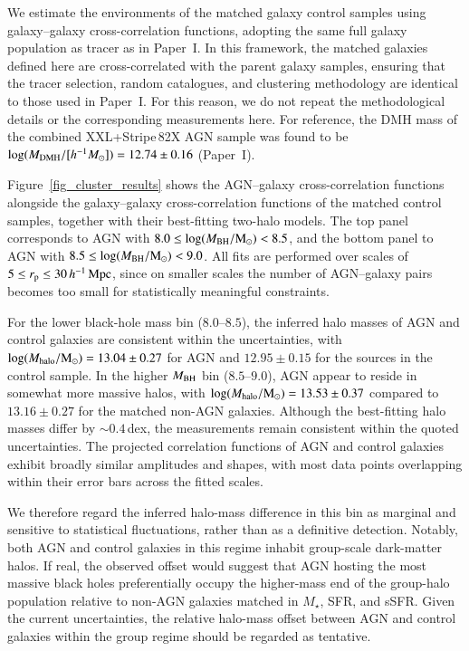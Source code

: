 \documentclass{aa}
\begin{document}
We estimate the environments of the matched galaxy control samples using galaxy--galaxy cross-correlation functions, adopting the same full galaxy population as tracer as in Paper~I. In this framework, the matched galaxies defined here are cross-correlated with the parent galaxy samples, ensuring that the tracer selection, random catalogues, and clustering methodology are identical to those used in Paper~I. For this reason, we do not repeat the methodological details or the corresponding measurements here. For reference, the DMH mass of the combined XXL+Stripe\,82X AGN sample was found to be 
$\log(M_{\rm DMH}/[h^{-1}M_{\odot}]) = 12.74 \pm 0.16$ (Paper~I).


Figure~\ref{fig_cluster_results} shows the AGN--galaxy cross-correlation functions alongside the galaxy--galaxy cross-correlation functions of the matched control samples, together with their best-fitting two-halo models.  
The top panel corresponds to AGN with $8.0 \le \log(M_{\rm BH}/{\rm M_\odot}) < 8.5$, and the bottom panel to AGN with $8.5 \le \log(M_{\rm BH}/{\rm M_\odot}) < 9.0$.  
All fits are performed over scales of $5 \le r_{\rm p} \le 30\,h^{-1}\,{\rm Mpc}$, since on smaller scales the number of AGN--galaxy pairs becomes too small for statistically meaningful constraints.

For the lower black-hole mass bin ($8.0$--$8.5$), the inferred halo masses of AGN and control galaxies are consistent within the uncertainties, with
$\log(M_{\rm halo}/{\rm M_\odot}) = 13.04\pm0.27$ for AGN and
$12.95\pm0.15$ for the sources in the control sample.
In the higher $M_{\rm BH}$ bin ($8.5$--$9.0$), AGN appear to reside in somewhat more massive halos, with
$\log(M_{\rm halo}/{\rm M_\odot}) = 13.53\pm0.37$
compared to
$13.16\pm0.27$ for the matched non-AGN galaxies.
Although the best-fitting halo masses differ by $\sim0.4$\,dex, the measurements remain consistent within the quoted uncertainties.
The projected correlation functions of AGN and control galaxies exhibit broadly similar amplitudes and shapes, with most data points overlapping within their error bars across the fitted scales.

We therefore regard the inferred halo-mass difference in this bin as marginal and sensitive to statistical fluctuations, rather than as a definitive detection.
Notably, both AGN and control galaxies in this regime inhabit group-scale dark-matter halos.
If real, the observed offset would suggest that AGN hosting the most massive black holes preferentially occupy the higher-mass end of the group-halo population relative to non-AGN galaxies matched in $M_\star$, SFR, and sSFR.
Given the current uncertainties, the relative halo-mass offset between AGN and control galaxies within the group regime should be regarded as tentative.
\end{document}
